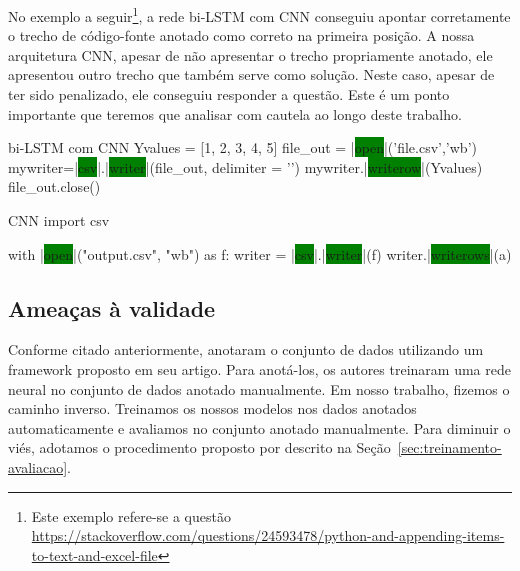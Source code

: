 No exemplo a seguir\footnote{Este exemplo refere-se a questão \url{https://stackoverflow.com/questions/24593478/python-and-appending-items-to-text-and-excel-file}\label{foot:exemplo-resultados-preliminares}}, a rede bi-LSTM com CNN conseguiu apontar corretamente o trecho de código-fonte anotado como correto na primeira posição.
A nossa arquitetura CNN, apesar de não apresentar o trecho propriamente anotado, ele apresentou outro trecho que também serve como solução. Neste caso, apesar de ter sido penalizado, ele conseguiu responder a questão. Este é um ponto importante que teremos que analisar com cautela ao longo deste trabalho. 

\begin{tcolorbox}[colframe=orange!75!black,colback=gray!15!white,fonttitle=\bfseries,adjusted title=\large{Python and appending items to text and \colorbox{green}{excel} \colorbox{green}{file}}~\ref{foot:exemplo-resultados-preliminares},
enlarge top by=1cm%
]
\begin{mypython-without-margin}{bi-LSTM com CNN}
Yvalues = [1, 2, 3, 4, 5]
file_out = |\colorbox{green}{open}|('file.csv','wb')
mywriter=|\colorbox{green}{csv}|.|\colorbox{green}{writer}|(file_out, delimiter = '\n')
mywriter.|\colorbox{green}{writerow}|(Yvalues)
file_out.close()
\end{mypython-without-margin}

\begin{mypython-without-margin}{CNN}
import csv

with |\colorbox{green}{open}|("output.csv", "wb") as f:
    writer = |\colorbox{green}{csv}|.|\colorbox{green}{writer}|(f)
    writer.|\colorbox{green}{writerows}|(a)
\end{mypython-without-margin}

\end{tcolorbox}

\subsection{Ameaças à validade}

Conforme citado anteriormente, \cite{yao-2018} anotaram o conjunto de dados utilizando um framework proposto em seu artigo. Para anotá-los, os autores treinaram uma rede neural no conjunto de dados anotado manualmente. Em nosso trabalho, fizemos o caminho inverso. Treinamos os nossos modelos nos dados anotados automaticamente e avaliamos no conjunto anotado manualmente. Para diminuir o viés, adotamos o procedimento proposto por \cite{iyer-etal-2016-summarizing} descrito na Seção~\ref{sec:treinamento-avaliacao}.

